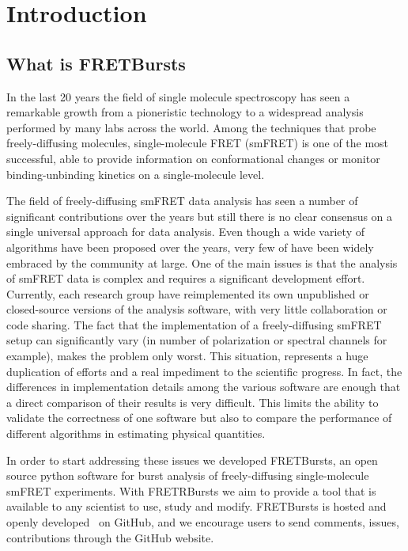 \section{Introduction}

\subsection{What is FRETBursts}

In the last 20 years the field of single molecule spectroscopy has seen a remarkable
growth from a pioneristic technology to a widespread analysis performed by many labs
across the world. Among the techniques that probe freely-diffusing molecules,
single-molecule FRET (smFRET) is one of the most successful, able to provide
information on conformational changes or monitor binding-unbinding kinetics on
a single-molecule level.

The field of freely-diffusing smFRET data analysis has seen a number of significant 
contributions over the years but still there is no clear consensus on a single
universal approach for data analysis.
Even though a wide variety of algorithms have been proposed over the years, very few 
of have been widely embraced by the community at large. One of the main issues 
is that the analysis of smFRET data is complex and requires a significant 
development effort. Currently,
each research group have reimplemented its own unpublished or closed-source versions
of the analysis software, with very little collaboration or code sharing. 
The fact that the implementation of a freely-diffusing smFRET setup can significantly 
vary (in number of polarization or spectral channels for example), 
makes the problem only worst.
This situation, represents a huge duplication of efforts and a real 
impediment to the scientific progress. 
In fact, the differences in implementation details among the various software
are enough that a direct comparison of their results is very difficult. 
This limits the ability to validate the correctness
of one software but also to compare the performance of different algorithms
in estimating physical quantities.

In order to start addressing these issues we developed FRETBursts, 
an open source python software for burst analysis of freely-diffusing
single-molecule smFRET experiments. 
With FRETRBursts we aim to provide a tool that is available to any scientist
to use, study and modify. 
FRETBursts is hosted and openly developed~\cite{Prli__2012} on GitHub, 
and we encourage users to send comments, issues, contributions through
the GitHub website.

